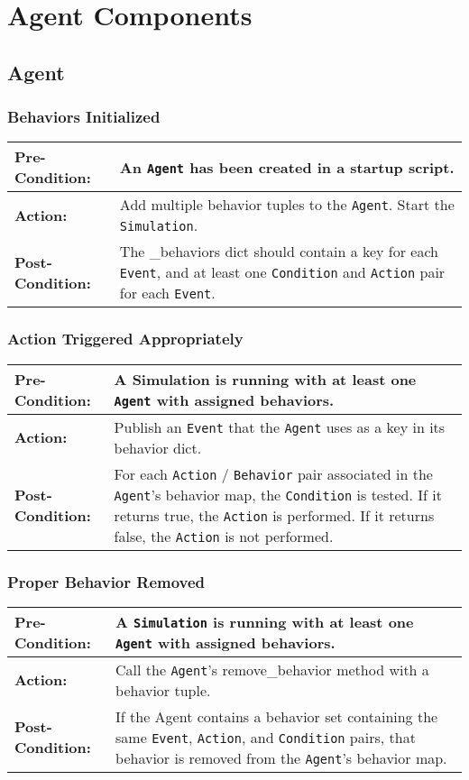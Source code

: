 \documentclass[titlepage]{article}
\newcommand{\testcase}[3]{
    \begin{center}
    \begin{tabular}{| l | p{0.7\textwidth}|}
        \hline
        \rowcolor[gray]{0.8}\textbf{Pre-Condition:} & #1 \\ \hline
        \textbf{Action:} & #2 \\ \hline
        \rowcolor[gray]{0.8}\textbf{Post-Condition:} & #3 \\ \hline
    \end{tabular}
    \end{center}
}
\begin{document}
\section{Agent Components}
\subsection{Agent}
\subsubsection{Behaviors Initialized}
\testcase{An \texttt{Agent} has been created in a startup script.}{Add multiple behavior tuples to the \texttt{Agent}.
Start the \texttt{Simulation}.}{The \_behaviors dict should contain a key for each \texttt{Event}, and at least one 
\texttt{Condition} and \texttt{Action} pair for each \texttt{Event}.}

\subsubsection{Action Triggered Appropriately}
\testcase{A Simulation is running with at least one \texttt{Agent} with assigned behaviors.}{Publish an \texttt{Event}
that the \texttt{Agent} uses as a key in its behavior dict.}{For each \texttt{Action} / \texttt{Behavior} pair
associated in the \texttt{Agent}'s behavior map, the \texttt{Condition} is tested.  If it returns true, the
\texttt{Action} is performed.  If it returns false, the \texttt{Action} is not performed.}

\subsubsection{Proper Behavior Removed}
\testcase{A \texttt{Simulation} is running with at least one \texttt{Agent} with assigned behaviors.}{Call the
\texttt{Agent}'s remove\_behavior method with a behavior tuple.}{If the Agent contains a behavior set containing the
same \texttt{Event}, \texttt{Action}, and \texttt{Condition} pairs, that behavior is removed from the \texttt{Agent}'s
behavior map.}

\end{document}
